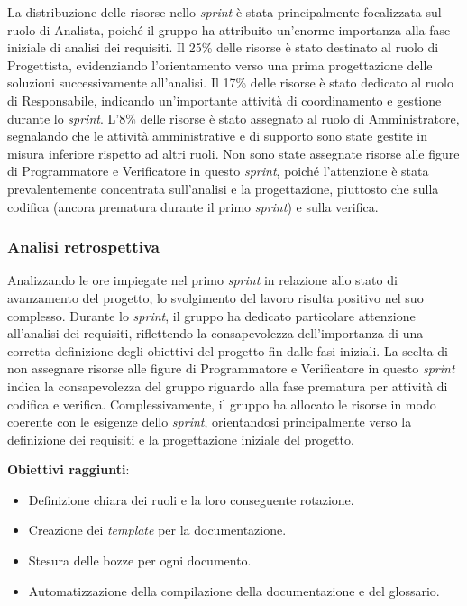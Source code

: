 La distribuzione delle risorse nello \textit{sprint} è stata principalmente focalizzata sul ruolo di Analista, poiché il gruppo ha attribuito 
un'enorme importanza alla fase iniziale di analisi dei requisiti.
Il 25\% delle risorse è stato destinato al ruolo di Progettista, evidenziando l'orientamento verso una prima progettazione delle soluzioni 
successivamente all'analisi.
Il 17\% delle risorse è stato dedicato al ruolo di Responsabile, indicando un'importante attività di coordinamento e gestione durante lo 
\textit{sprint}.
L'8\% delle risorse è stato assegnato al ruolo di Amministratore, segnalando che le attività amministrative e di supporto sono state gestite
in misura inferiore rispetto ad altri ruoli.
Non sono state assegnate risorse alle figure di Programmatore e Verificatore in questo \textit{sprint}, poiché l'attenzione è stata prevalentemente 
concentrata sull'analisi e la progettazione, piuttosto che sulla codifica (ancora prematura durante il primo \textit{sprint}) e sulla verifica.

\subsubsection{Analisi retrospettiva}

Analizzando le ore impiegate nel primo \textit{sprint} in relazione allo stato di avanzamento del progetto, lo svolgimento del lavoro risulta positivo nel suo complesso. 
Durante lo \textit{sprint}, il gruppo ha dedicato particolare attenzione all'analisi dei requisiti, riflettendo la consapevolezza dell'importanza di una corretta definizione degli 
obiettivi del progetto fin dalle fasi iniziali.
La scelta di non assegnare risorse alle figure di Programmatore e Verificatore in questo \textit{sprint} indica la consapevolezza del gruppo riguardo alla fase prematura per 
attività di codifica e verifica. Complessivamente, il gruppo ha allocato le risorse in modo coerente con le esigenze dello \textit{sprint}, orientandosi principalmente verso la definizione 
dei requisiti e la progettazione iniziale del progetto.

\textbf{Obiettivi raggiunti}:
\begin{itemize}
	\item Definizione chiara dei ruoli e la loro conseguente rotazione.
	\item Creazione dei \textit{template} per la documentazione.
	\item Stesura delle bozze per ogni documento.
	\item Automatizzazione della compilazione della documentazione e del glossario.
\end{itemize}

